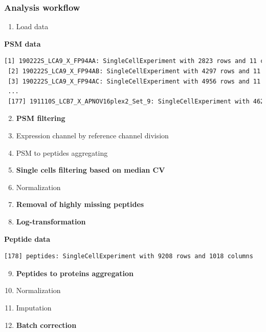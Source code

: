 \documentclass{beamer}
\newcommand{\frametitlesection}[1]{\frametitle{\centering #1 \footnotesize \hspace{0pt plus 1 filll} \insertsection}}
\begin{document}
\begin{frame}[fragile]
    \frametitlesection{Analysis workflow}
    
    \scriptsize
    
    \begin{enumerate}
        \item Load data
    \end{enumerate}
    
    \textbf{PSM data}
    
    \begin{lstlisting}[language = TeX, numbers = none, basicstyle = \ttfamily\@setfontsize{\srcsize}{5pt}{5pt}\color{vdgray}]
 [1] 190222S_LCA9_X_FP94AA: SingleCellExperiment with 2823 rows and 11 columns 
 [2] 190222S_LCA9_X_FP94AB: SingleCellExperiment with 4297 rows and 11 columns 
 [3] 190222S_LCA9_X_FP94AC: SingleCellExperiment with 4956 rows and 11 columns 
 ...
 [177] 191110S_LCB7_X_APNOV16plex2_Set_9: SingleCellExperiment with 4626 rows and 16 columns
    \end{lstlisting}
    
    \pause
    
    \begin{enumerate}
        \setcounter{enumi}{1}
        \item \textbf<4>{PSM filtering}
        \item Expression channel by reference channel division
        \item PSM to peptides aggregating
        \item \textbf<4>{Single cells filtering based on median CV}
        \item Normalization
        \item \textbf<4>{Removal of highly missing peptides}
        \item \textbf<4>{Log-transformation}
    \end{enumerate}
    
    \textbf{Peptide data}
    
    \begin{lstlisting}[language = TeX, numbers = none, basicstyle = \ttfamily\@setfontsize{\srcsize}{5pt}{5pt}\color{vdgray}]
 [178] peptides: SingleCellExperiment with 9208 rows and 1018 columns
    \end{lstlisting}
    
    \pause
    
    \begin{enumerate}
        \setcounter{enumi}{8}
        \item \textbf<4>{Peptides to proteins aggregation}
        \item Normalization
        \item Imputation
        \item \textbf<4>{Batch correction}
    \end{enumerate}
    

\end{frame}
\end{document}
